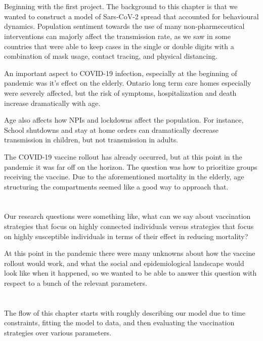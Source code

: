 \documentclass{article}
\begin{document}
\section{}
Beginning with the first project. The background to this chapter is that we wanted to construct a model of Sars-CoV-2 spread that accounted for behavioural dynamics. Population sentiment towards the use of many non-pharmeceutical interventions can majorly affect the transmission rate, as we saw in some countries that were able to keep cases in the single or double digits with a combination of mask usage, contact tracing, and physical distancing.

An important aspect to COVID-19 infection, especially at the beginning of pandemic was it's effect on the elderly. Ontario long term care homes especially were severely affected, but the risk of symptoms, hospitalization and death increase dramatically with age. 

Age also affects how NPIs and lockdowns affect the population. For instance, School shutdowns and stay at home orders can dramatically decrease transmission in children, but not transmission in adults.  

The COVID-19 vaccine rollout has already occurred, but at this point in the pandemic it was far off on the horizon. The question was how to prioritize groups receiving the vaccine. Due to the aforementioned mortality in the elderly, age structuring the compartments seemed like a good way to approach that. 


\section{}

Our research questions were something like, what can we say about vaccination strategies that focus on highly connected individuals versus strategies that focus on highly susceptible individuals in terms of their effect in reducing mortality?

At this point in the pandemic there were many unknowns about how the vaccine rollout would work, and what the social and epidemiological landscape would look like when it happened, so we wanted to be able to answer this question with respect to a bunch of the relevant parameters.


\section{}

The flow of this chapter starts with roughly describing our model due to time constraints, fitting the model to data, and then evaluating the vaccination strategies over various parameters.
\end{document}
